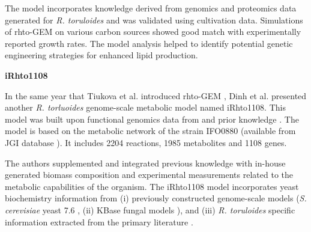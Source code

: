 The model incorporates knowledge derived from genomics and proteomics data generated for \textit{R. toruloides} and was validated using cultivation data. Simulations of rhto-GEM on various carbon sources showed good match with experimentally reported growth rates. The model analysis helped to identify potential genetic engineering strategies for enhanced lipid production. \cite{Tiukova2019}


\textbf{iRhto1108}

In the same year that Tiukova et al. introduced rhto-GEM \cite{Tiukova2019}, Dinh et al. presented another \textit{R. torluoides} 
genome-scale metabolic model named iRhto1108. This model was built upon functional genomics data from \cite{Coradetti2018} and prior knowledge \cite{Dinh2019}. The model is based on the metabolic network of the strain IFO0880 \cite{Coradetti2018} (available from JGI database \cite{IFO0880_v4}). It includes 2204 reactions, 1985 metabolites and 1108 genes. 

The authors supplemented and integrated previous knowledge with in-house generated biomass composition and experimental
measurements related to the metabolic capabilities of the organism. 
The iRhto1108 model incorporates yeast biochemistry information from (i) previously constructed genome-scale models (\textit{S. cerevisiae} yeast 7.6 \cite{Aung2013}, (ii) KBase fungal
models \cite{Arkin2018}), and (iii) \textit{R. toruloides} specific information
extracted from the primary literature \cite{Coradetti2018}\cite{Jagtap2017}\cite{Kot2018}. 



